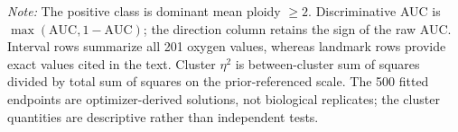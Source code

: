 \begin{table}[!htbp]
\begin{minipage}{0.96\textwidth}
\footnotesize
\textit{Note:} The positive class is dominant mean ploidy $\geq2$. Discriminative AUC is $\max(\mathrm{AUC},1-\mathrm{AUC})$; the direction column retains the sign of the raw AUC. Interval rows summarize all 201 oxygen values, whereas landmark rows provide exact values cited in the text. Cluster $\eta^2$ is between-cluster sum of squares divided by total sum of squares on the prior-referenced scale. The 500 fitted endpoints are optimizer-derived solutions, not biological replicates; the cluster quantities are descriptive rather than independent tests.
\end{minipage}
\end{table}
